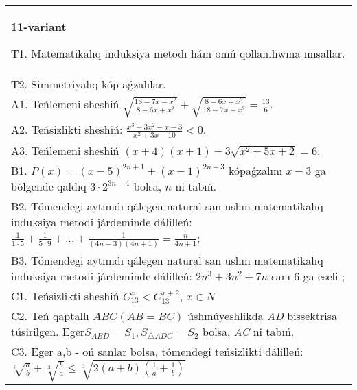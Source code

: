 \documentclass{article}
\begin{document}
\begin{tabular}{m{17cm}}
\textbf{11-variant}
\newline

T1. Matematikalıq induksiya metodı hám onıń qollanılıwına mısallar. \\
T2. Simmetriyalıq kóp aǵzalılar. \\
A1. Teńlemeni sheshiń \(\sqrt{\frac{18 - 7x - x^{2}}{8 - 6x + x^{2}}} + \sqrt{\frac{8 - 6x + x^{2}}{18 - 7x - x^{2}}} = \frac{13}{6}\). \\
A2. Teńsizlikti sheshiń: \(\frac{x^{3} + 3x^{2} - x - 3}{x^{2} + 3x - 10} < 0\). \\
A3. Teńlemeni sheshiń \((x + 4)(x + 1) - 3\sqrt{x^{2} + 5x + 2} = 6\). \\
B1. \(P(x) = (x - 5)^{2n + 1} + (x - 1)^{2n + 3}\) kópaǵzalını \(x - 3\) ga bólgende qaldıq \(3 \cdot 2^{3n - 4}\) bolsa, \(n\) ni tabıń. \\
B2. Tómendegi aytımdı qálegen natural san ushın matematikalıq induksiya metodi járdeminde dálilleń: \(\frac{1}{1 \cdot 5} + \frac{1}{5 \cdot 9} + ... + \frac{1}{(4n - 3)(4n + 1)} = \frac{n}{4n + 1}\); \\
B3. Tómendegi aytımdı qálegen natural san ushın matematikalıq induksiya metodi járdeminde dálilleń: \(2n^{3} + 3n^{2} + 7n\) sanı 6 ga eseli ; \\
C1. Teńsizlikti sheshiń \(C_{13}^{x} < C_{13}^{x + 2}\), \(x \in N\) \\
C2. Teń qaptallı \(ABC(AB = BC)\) úshmúyeshlikda \emph{AD} bissektrisa túsirilgen. Eger\(S_{ABD} = S_{1},S_{\bigtriangleup ADC} = S_{2}\) bolsa, \emph{AC} ni tabıń. \\
C3. Eger a,b - oń sanlar bolsa, tómendegi teńsizlikti dálilleń: \(\sqrt[3]{\frac{a}{b}} + \sqrt[3]{\frac{b}{a}} \leq \sqrt[3]{2(a + b)\left( \frac{1}{a} + \frac{1}{b} \right)}\) \\

\end{tabular}
\vspace{1cm}
\end{document}
